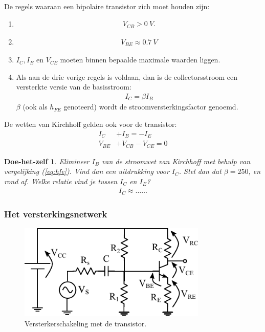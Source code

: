 \documentclass{article}
\newtheorem{DIY}{Doe-het-zelf}
\begin{document}
				De regels waaraan een bipolaire transistor zich moet houden zijn:
				\begin{enumerate}
\item
					\begin{align}
					    V_{CB} > 0~V. 
					\end{align}

\item
					\begin{align}
					    V_{BE} \approx 0.7~V
					\end{align}

					\item $I_C, I_B$ en $V_{CE} $ moeten binnen bepaalde maximale waarden liggen.

					\item Als aan de drie vorige regels is voldaan, dan is de collectorsstroom een versterkte versie van de basisstroom: 
					\begin{align}
					    I_C = \beta I_B
					    \label{eq:hfe}
					\end{align}
					$\beta$ (ook als $h_{FE}$ genoteerd) wordt de stroomversterkingsfactor genoemd.

				\end{enumerate}

				De wetten van Kirchhoff gelden ook voor de transistor:
				\begin{align}
				    I_C		&+ I_B = -I_E \\
				    V_{BE}  &+ V_{CB} - V_{CE} = 0
				\end{align}

				\begin{DIY} Elimineer $I_B$ van de stroomwet van Kirchhoff met behulp van vergelijking (\ref{eq:hfe}). Vind dan een uitdrukking voor $I_C$. Stel dan dat $\beta = 250$, en rond af. Welke relatie vind je tussen $I_C$ en $I_E$? 
				\begin{align*}
				    I_C \approx \ldots \ldots
				\end{align*}
				\end{DIY}
\vspace{30ex}
			\subsubsection{Het versterkingsnetwerk}


				\begin{figure}[htbp]
					\centering
					\includegraphics[width=0.8\textwidth]{ges}
					\caption{Versterkerschakeling met de transistor.}
					\label{fig:ges}
				\end{figure}
\end{document}

